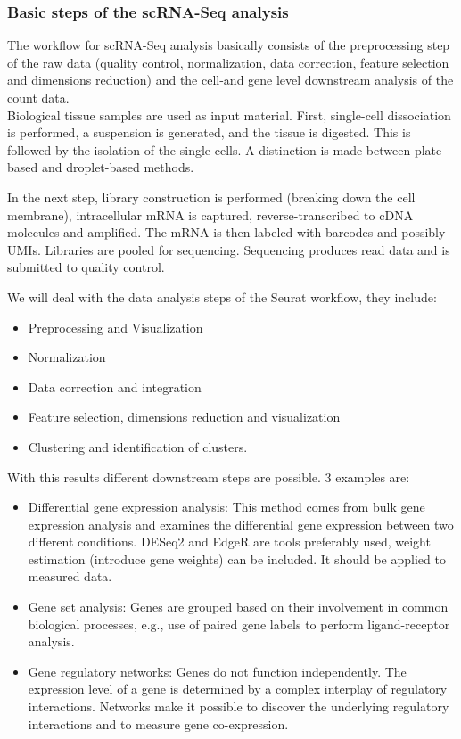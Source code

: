 \hypertarget{basic-steps-of-the-scrna-seq-analysis}{%
\subsubsection{Basic steps of the scRNA-Seq
analysis}\label{basic-steps-of-the-scrna-seq-analysis}}

The workflow for scRNA-Seq analysis basically consists of the
preprocessing step of the raw data (quality control, normalization, data
correction, feature selection and dimensions reduction) and the cell-and
gene level downstream analysis of the count data.\\
Biological tissue samples are used as input material. First, single-cell
dissociation is performed, a suspension is generated, and the tissue is
digested. This is followed by the isolation of the single cells. A
distinction is made between plate-based and droplet-based methods.

In the next step, library construction is performed (breaking down the
cell membrane), intracellular mRNA is captured, reverse-transcribed to
cDNA molecules and amplified. The mRNA is then labeled with barcodes and
possibly UMIs. Libraries are pooled for sequencing. Sequencing produces
read data and is submitted to quality control.

We will deal with the data analysis steps of the Seurat workflow, they
include:

\begin{itemize}
\tightlist
\item
  Preprocessing and Visualization
\item
  Normalization
\item
  Data correction and integration
\item
  Feature selection, dimensions reduction and visualization
\item
  Clustering and identification of clusters.
\end{itemize}

With this results different downstream steps are possible. 3 examples
are:

\begin{itemize}
\item
  Differential gene expression analysis: This method comes from bulk
  gene expression analysis and examines the differential gene expression
  between two different conditions. DESeq2 and EdgeR are tools
  preferably used, weight estimation (introduce gene weights) can be
  included. It should be applied to measured data.
\item
  Gene set analysis: Genes are grouped based on their involvement in
  common biological processes, e.g., use of paired gene labels to
  perform ligand-receptor analysis.
\item
  Gene regulatory networks: Genes do not function independently. The
  expression level of a gene is determined by a complex interplay of
  regulatory interactions. Networks make it possible to discover the
  underlying regulatory interactions and to measure gene co-expression.
\end{itemize}

